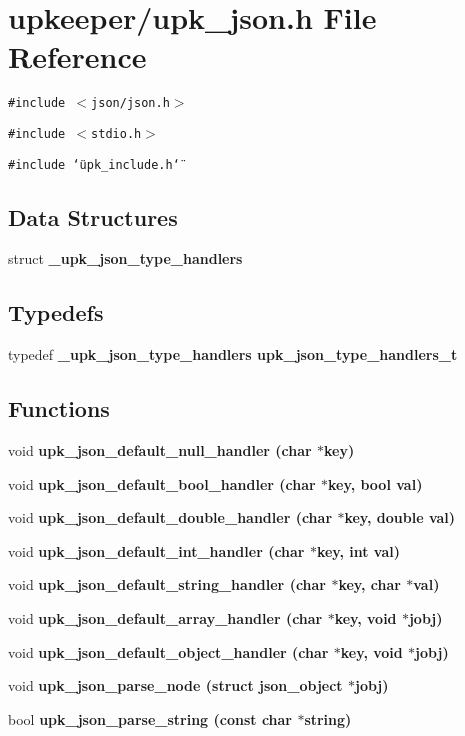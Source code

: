 \section{upkeeper/upk\_\-json.h File Reference}
\label{upk__json_8h}
{\tt \#include $<$json/json.h$>$}\par
{\tt \#include $<$stdio.h$>$}\par
{\tt \#include \char`\"{}upk\_\-include.h\char`\"{}}\par
\subsection*{Data Structures}
\begin{CompactItemize}
\item 
struct \bf{\_\-upk\_\-json\_\-type\_\-handlers}
\end{CompactItemize}
\subsection*{Typedefs}
\begin{CompactItemize}
\item 
typedef \bf{\_\-upk\_\-json\_\-type\_\-handlers} \bf{upk\_\-json\_\-type\_\-handlers\_\-t}
\end{CompactItemize}
\subsection*{Functions}
\begin{CompactItemize}
\item 
void \bf{upk\_\-json\_\-default\_\-null\_\-handler} (char $\ast$key)
\item 
void \bf{upk\_\-json\_\-default\_\-bool\_\-handler} (char $\ast$key, bool val)
\item 
void \bf{upk\_\-json\_\-default\_\-double\_\-handler} (char $\ast$key, double val)
\item 
void \bf{upk\_\-json\_\-default\_\-int\_\-handler} (char $\ast$key, int val)
\item 
void \bf{upk\_\-json\_\-default\_\-string\_\-handler} (char $\ast$key, char $\ast$val)
\item 
void \bf{upk\_\-json\_\-default\_\-array\_\-handler} (char $\ast$key, void $\ast$jobj)
\item 
void \bf{upk\_\-json\_\-default\_\-object\_\-handler} (char $\ast$key, void $\ast$jobj)
\item 
void \bf{upk\_\-json\_\-parse\_\-node} (struct json\_\-object $\ast$jobj)
\item 
bool \bf{upk\_\-json\_\-parse\_\-string} (const char $\ast$string)
\end{CompactItemize}
